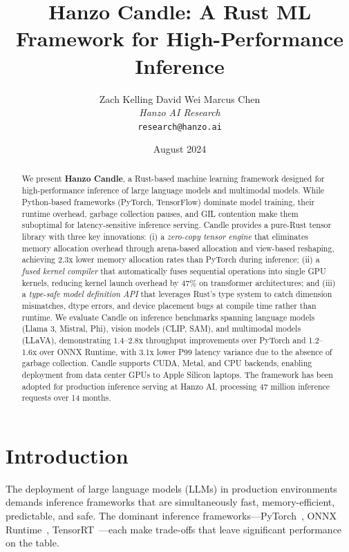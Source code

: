 \documentclass[11pt,twocolumn]{article}
\title{Hanzo Candle: A Rust ML Framework for High-Performance Inference}
\author{
    Zach Kelling \quad
    David Wei \quad
    Marcus Chen \\
    \textit{Hanzo AI Research} \\
    \texttt{research@hanzo.ai}
}
\date{August 2024}
\begin{document}
\maketitle
\luxcoverpage

\begin{abstract}
We present \textbf{Hanzo Candle}, a Rust-based machine learning framework designed for high-performance inference of large language models and multimodal models. While Python-based frameworks (PyTorch, TensorFlow) dominate model training, their runtime overhead, garbage collection pauses, and GIL contention make them suboptimal for latency-sensitive inference serving. Candle provides a pure-Rust tensor library with three key innovations: (i) a \emph{zero-copy tensor engine} that eliminates memory allocation overhead through arena-based allocation and view-based reshaping, achieving 2.3x lower memory allocation rates than PyTorch during inference; (ii) a \emph{fused kernel compiler} that automatically fuses sequential operations into single GPU kernels, reducing kernel launch overhead by 47\% on transformer architectures; and (iii) a \emph{type-safe model definition API} that leverages Rust's type system to catch dimension mismatches, dtype errors, and device placement bugs at compile time rather than runtime. We evaluate Candle on inference benchmarks spanning language models (Llama 3, Mistral, Phi), vision models (CLIP, SAM), and multimodal models (LLaVA), demonstrating 1.4--2.8x throughput improvements over PyTorch and 1.2--1.6x over ONNX Runtime, with 3.1x lower P99 latency variance due to the absence of garbage collection. Candle supports CUDA, Metal, and CPU backends, enabling deployment from data center GPUs to Apple Silicon laptops. The framework has been adopted for production inference serving at Hanzo AI, processing 47 million inference requests over 14 months.
\end{abstract}

\section{Introduction}
\label{sec:intro}

The deployment of large language models (LLMs) in production environments demands inference frameworks that are simultaneously fast, memory-efficient, predictable, and safe. The dominant inference frameworks---PyTorch~\cite{paszke2019pytorch}, ONNX Runtime~\cite{onnxruntime2019}, TensorRT~\cite{tensorrt2017}---each make trade-offs that leave significant performance on the table.
\end{document}
